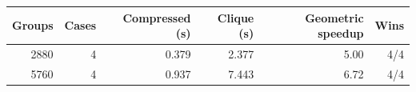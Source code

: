 \begin{tabular}{rrrrrr}
\toprule
Groups & Cases & Compressed (s) & Clique (s) & Geometric speedup & Wins \\
\midrule
2880 & 4 & 0.379 & 2.377 & 5.00 & 4/4 \\
5760 & 4 & 0.937 & 7.443 & 6.72 & 4/4 \\
\bottomrule
\end{tabular}
